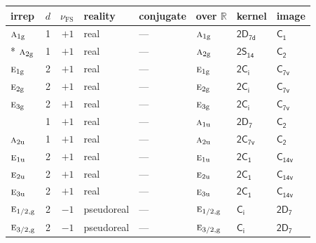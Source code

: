 \documentclass[10pt,a4paper]{article}
\makeatletter
\def\grouprule#1#2{\noalign{\marks\LTgroupmarks{\the\belowrulesep}\nobreak\vskip#1%
  \vskip\aboverulesep}\multispan\LT@cols\unskip{\leaders\hrule\@height#2\hfill\kern\z@}\cr
  \noalign{\penalty\LTrulebreak\vskip\belowrulesep\global\@lastruleclass\z@}}
\numberwithin{equation}{section}
\newcommand{\grp}[1]{\mathsf{#1}}
\newcommand{\irr}[1]{\text{\normalfont\scshape #1}}
\newcommand{\detbox}[1]{{\setlength{\fboxsep}{1pt}\fbox{#1}}}
\newcommand{\ptag}[1]{\mathrm{#1}}
\newcommand{\fsind}{\nu_{\mathrm{FS}}}
\makeatother
\begin{document}
{\small\renewcommand{\arraystretch}{1.25}\setlength{\tabcolsep}{4pt}\begin{longtable}{@{}lrrlllll@{}}\toprule
irrep & $d$ & $\fsind$ & reality & conjugate & over $\mathbb{R}$ & kernel & image\\\midrule\endhead
\bottomrule\endfoot\endlastfoot
$\irr{a}_{1\ptag{g}}$ & 1 & $+1$ & real & --- & $\irr{a}_{1\ptag{g}}$ & \href{2D7d.pdf}{$\grp{2D_{7d}}$} & \href{../../../rotation/data/pdf/C1.pdf}{$\grp{C_{1}}$}\\*
$\irr{a}_{2\ptag{g}}$ & 1 & $+1$ & real & --- & $\irr{a}_{2\ptag{g}}$ & \href{2S14.pdf}{$\grp{2S_{14}}$} & \href{../../../rotation/data/pdf/C2.pdf}{$\grp{C_{2}}$}\\
$\irr{e}_{1\ptag{g}}$ & 2 & $+1$ & real & --- & $\irr{e}_{1\ptag{g}}$ & \href{2S2.pdf}{$\grp{2C_{i}}$} & \href{../../../rotation/data/pdf/C7v.pdf}{$\grp{C_{7v}}$}\\
$\irr{e}_{2\ptag{g}}$ & 2 & $+1$ & real & --- & $\irr{e}_{2\ptag{g}}$ & \href{2S2.pdf}{$\grp{2C_{i}}$} & \href{../../../rotation/data/pdf/C7v.pdf}{$\grp{C_{7v}}$}\\
$\irr{e}_{3\ptag{g}}$ & 2 & $+1$ & real & --- & $\irr{e}_{3\ptag{g}}$ & \href{2S2.pdf}{$\grp{2C_{i}}$} & \href{../../../rotation/data/pdf/C7v.pdf}{$\grp{C_{7v}}$}\\
\detbox{$\irr{a}_{1\ptag{u}}$} & 1 & $+1$ & real & --- & $\irr{a}_{1\ptag{u}}$ & \href{2D7.pdf}{$\grp{2D_{7}}$} & \href{../../../rotation/data/pdf/C2.pdf}{$\grp{C_{2}}$}\\
$\irr{a}_{2\ptag{u}}$ & 1 & $+1$ & real & --- & $\irr{a}_{2\ptag{u}}$ & \href{2C7v.pdf}{$\grp{2C_{7v}}$} & \href{../../../rotation/data/pdf/C2.pdf}{$\grp{C_{2}}$}\\
$\irr{e}_{1\ptag{u}}$ & 2 & $+1$ & real & --- & $\irr{e}_{1\ptag{u}}$ & \href{2C1.pdf}{$\grp{2C_{1}}$} & $\grp{C_{14v}}$\\
$\irr{e}_{2\ptag{u}}$ & 2 & $+1$ & real & --- & $\irr{e}_{2\ptag{u}}$ & \href{2C1.pdf}{$\grp{2C_{1}}$} & $\grp{C_{14v}}$\\
$\irr{e}_{3\ptag{u}}$ & 2 & $+1$ & real & --- & $\irr{e}_{3\ptag{u}}$ & \href{2C1.pdf}{$\grp{2C_{1}}$} & $\grp{C_{14v}}$\\
\grouprule{0pt}{\lightrulewidth}
$\irr{e}_{1/2,\ptag{g}}$ & 2 & $-1$ & pseudoreal & --- & $\irr{e}_{1/2,\ptag{g}}$ & \href{S2.pdf}{$\grp{C_{i}}$} & \href{2D7.pdf}{$\grp{2D_{7}}$}\\
$\irr{e}_{3/2,\ptag{g}}$ & 2 & $-1$ & pseudoreal & --- & $\irr{e}_{3/2,\ptag{g}}$ & \href{S2.pdf}{$\grp{C_{i}}$} & \href{2D7.pdf}{$\grp{2D_{7}}$}\\

\end{longtable}}
\end{document}
